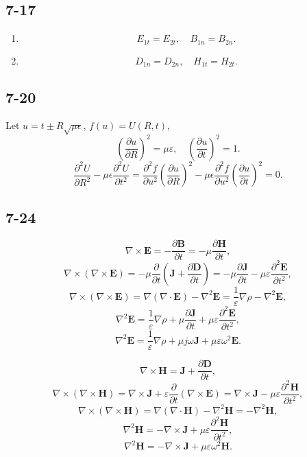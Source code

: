 \documentclass[6pt,a4paper]{article}
\begin{document}
\subsection{7-17}
\begin{enumerate}[label=\alph*)]
\item
$$E_{1t}=E_{2t},\quad B_{1n}=B_{2n}.$$
\item
$$D_{1n}=D_{2n},\quad H_{1t}=H_{2t}.$$
\end{enumerate}

\subsection{7-20}
Let $u=t\pm R\sqrt{\mu\epsilon}$, $f(u)=U(R,t)$,
$$\left(\frac{\partial u}{\partial R}\right)^2=\mu\varepsilon,\quad \left(\frac{\partial u}{\partial t}\right)^2=1.$$
$$\frac{\partial^2 U}{\partial R^2}-\mu\epsilon\frac{\partial^2 U}{\partial t^2}=\frac{\partial^2 f}{\partial u^2}\left(\frac{\partial u}{\partial R}\right)^2-\mu\epsilon\frac{\partial^2 f}{\partial u^2}\left(\frac{\partial u}{\partial t}\right)^2=0.$$

\subsection{7-24}
$$\nabla\times\mathbf{E}=-\frac{\partial\mathbf{B}}{\partial t}=-\mu\frac{\partial\mathbf{H}}{\partial t},$$
$$\nabla\times(\nabla\times\mathbf{E})=-\mu\frac{\partial}{\partial t}\left(\mathbf{J}+\frac{\partial\mathbf{D}}{\partial t}\right)=-\mu\frac{\partial\mathbf{J}}{\partial t}-\mu\varepsilon\frac{\partial^2\mathbf{E}}{\partial t^2},$$
$$\nabla\times(\nabla\times\mathbf{E})=\nabla(\nabla\cdot\mathbf{E})-\nabla^2\mathbf{E}=\frac{1}{\varepsilon}\nabla\rho-\nabla^2\mathbf{E},$$
$$\nabla^2\mathbf{E}=\frac{1}{\varepsilon}\nabla\rho+\mu\frac{\partial\mathbf{J}}{\partial t}+\mu\varepsilon\frac{\partial^2\mathbf{E}}{\partial t^2},$$
$$\nabla^2\mathbf{E}=\frac{1}{\varepsilon}\nabla\rho+\mu j\omega\mathbf{J}+\mu\varepsilon\omega^2\mathbf{E}.$$

$$\nabla\times\mathbf{H}=\mathbf{J}+\frac{\partial\mathbf{D}}{\partial t},$$
$$\nabla\times(\nabla\times\mathbf{H})=\nabla\times\mathbf{J}+\varepsilon\frac{\partial}{\partial t}(\nabla\times\mathbf{E})=\nabla\times\mathbf{J}-\mu\varepsilon\frac{\partial^2\mathbf{H}}{\partial t^2},$$
$$\nabla\times(\nabla\times\mathbf{H})=\nabla(\nabla\cdot\mathbf{H})-\nabla^2\mathbf{H}=-\nabla^2\mathbf{H},$$
$$\nabla^2\mathbf{H}=-\nabla\times\mathbf{J}+\mu\varepsilon\frac{\partial^2\mathbf{H}}{\partial t^2},$$
$$\nabla^2\mathbf{H}=-\nabla\times\mathbf{J}+\mu\varepsilon\omega^2\mathbf{H}.$$
\end{document}
